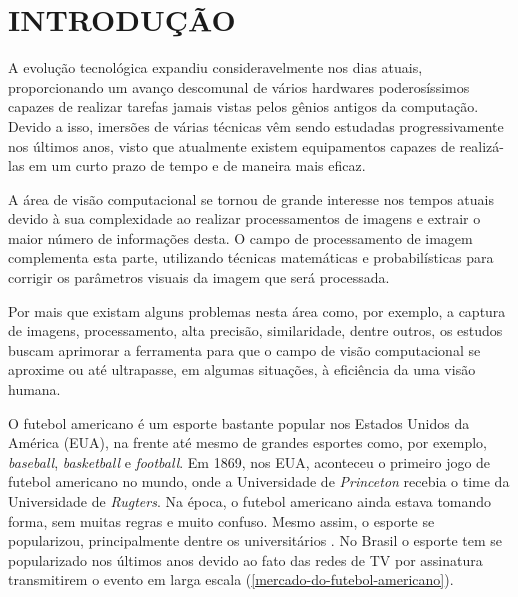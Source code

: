 \chapter{\textbf{INTRODUÇÃO}}
\label{cap-introducao}
A evolução tecnológica expandiu consideravelmente nos dias atuais, proporcionando um avanço descomunal de vários hardwares poderosíssimos capazes de realizar tarefas jamais vistas pelos gênios antigos da computação. Devido a isso, imersões de várias técnicas vêm sendo estudadas progressivamente nos últimos anos, visto que atualmente existem equipamentos capazes de realizá-las em um curto prazo de tempo e de maneira mais eficaz.

A área de visão computacional se tornou de grande interesse nos tempos atuais devido à sua complexidade ao realizar processamentos de imagens e extrair o maior número de informações desta. O campo de processamento de imagem complementa esta parte, utilizando técnicas matemáticas e probabilísticas para corrigir os parâmetros visuais da imagem que será processada.

Por mais que existam alguns problemas nesta área como, por exemplo, a captura de imagens, processamento, alta precisão, similaridade, dentre outros, os estudos buscam aprimorar a ferramenta para que o campo de visão computacional se aproxime ou até ultrapasse, em algumas situações, à eficiência da uma visão humana.

O futebol americano é um esporte bastante popular nos Estados Unidos da América (EUA), na frente até mesmo de grandes esportes como, por exemplo, \textit{baseball}, \textit{basketball} e \textit{football}. Em 1869, nos EUA, aconteceu o primeiro jogo de futebol americano no mundo, onde a Universidade de \textit{Princeton} recebia o time da Universidade de \textit{Rugters}. Na época, o futebol americano ainda estava tomando forma, sem muitas regras e muito confuso. Mesmo assim, o esporte se popularizou, principalmente dentre os universitários \cite{RODRIGUES2014}. No Brasil o esporte tem se popularizado nos últimos anos devido ao fato das redes de TV por assinatura transmitirem o evento em larga escala (\autoref{mercado-do-futebol-americano}). 



